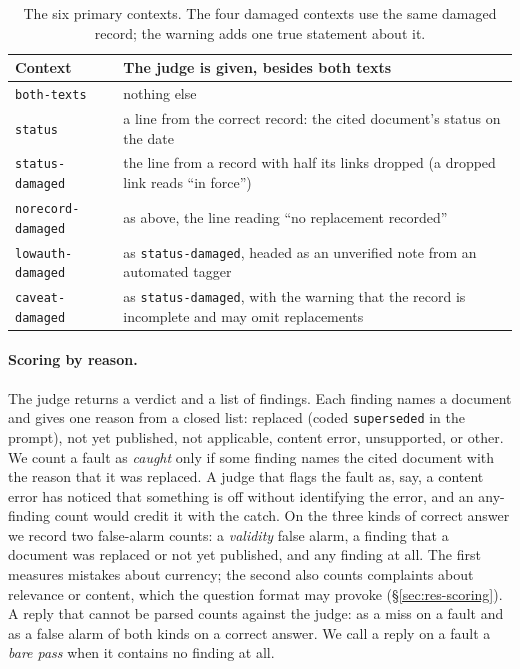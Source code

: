 \begin{table}[t]
\centering\footnotesize
\begin{tabular}{>{\raggedright\arraybackslash}p{2.6cm}>{\raggedright\arraybackslash}p{4.9cm}}
\toprule
Context & The judge is given, besides both texts \\
\midrule
\texttt{both-texts} & nothing else \\
\texttt{status} & a line from the correct record: the cited document's status on the date \\
\texttt{status-damaged} & the line from a record with half its links dropped (a dropped link reads ``in force'') \\
\texttt{norecord-damaged} & as above, the line reading ``no replacement recorded'' \\
\texttt{lowauth-damaged} & as \texttt{status-damaged}, headed as an unverified note from an automated tagger \\
\texttt{caveat-damaged} & as \texttt{status-damaged}, with the warning that the record is incomplete and may omit replacements \\
\bottomrule
\end{tabular}
\caption{The six primary contexts. The four damaged contexts use the same damaged record; the warning adds one true
statement about it.}
\label{tab:menu}
\end{table}

\paragraph{Scoring by reason.}
The judge returns a verdict and a list of findings. Each finding names a document and gives one reason from a closed
list: replaced (coded \texttt{superseded} in the prompt), not yet published, not applicable, content error, unsupported, or other. We count a fault as
\emph{caught} only if some finding names the cited document with the reason that it was replaced. A judge that flags
the fault as, say, a content error has noticed that something is off without identifying the error, and an any-finding
count would credit it with the catch. On the three kinds of correct answer we record two false-alarm counts: a
\emph{validity} false alarm, a finding that a document was replaced or not yet published, and any finding at all. The
first measures mistakes about currency; the second also counts complaints about relevance or content, which the
question format may provoke (\S\ref{sec:res-scoring}). A reply that cannot be parsed counts against the judge: as a miss
on a fault and as a false alarm of both kinds on a correct answer. We call a reply on a fault a \emph{bare pass} when it
contains no finding at all.

